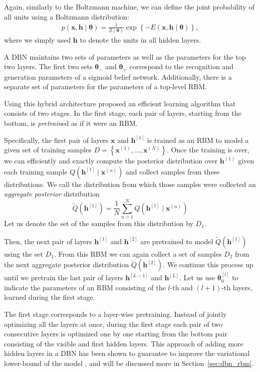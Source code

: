 \documentclass[dissertation,nocontribution]{aaltoseries}
\newcommand{\qlay}[1]{\left[#1\right]}
\newcommand{\vect}[1]{\mathbf{#1}}
\newcommand{\vects}[1]{\boldsymbol{#1}}
\newcommand{\vh}[0]{\vect{h}}
\newcommand{\vx}[0]{\vect{x}}
\newcommand{\TT}[0]{{\vects{\theta}}}
\begin{document}
Again, similarly to the Boltzmann machine, we can define the
joint probability of all units using a Boltzmann
distribution:
\begin{align*}
    p(\vx, \vh \mid \TT) = \frac{1}{Z(\TT)} \exp \left\{
    -E(\vx, \vh \mid \TT)
    \right\},
\end{align*}
where we simply used $\vh$ to denote the units in all hidden
layers.

A DBN maintains two sets of parameters as well as the
parameters for the top two layers.  The first two sets
$\TT_-$ and $\TT_+$ correspond to the recognition and
generation parameters of a sigmoid belief network.
Additionally, there is a separate set of parameters for the
parameters of a top-level RBM.

Using this hybrid architecture \citet{Hinton2006nc} proposed
an efficient learning algorithm that consists of two stages.
In the first stage, each pair of layers, starting from the
bottom, is \textit{pretrain}ed as if it were an RBM.

Specifically, the first pair of layers $\vx$ and
$\vh^{\qlay{1}}$
is trained as an RBM to model a given set of training
samples $D=\left\{ \vx^{(1)}, \dots, \vx^{(N)} \right\}$.
Once the training is over, we can efficiently and exactly
compute the posterior distribution over $\vh^{(1)}$ given
each training sample $Q(\vh^{\qlay{1}} \mid \vx^{(n)})$ and
collect samples from these distributions. We call the
distribution from which those samples were collected an
\textit{aggregate posterior} distribution
\[
\tilde{Q}\left( \vh^{\qlay{1}} \right) = \frac{1}{N}
\sum_{n=1}^N Q\left(\vh^{\qlay{1}} \mid \vx^{(n)}\right)
\]
Let us denote the set of the samples from this distribution by $D_1$. 

Then, the next pair of layers $\vh^{\qlay{1}}$ and
$\vh^{\qlay{2}}$ are pretrained to model $\tilde{Q}\left(
\vh^{\qlay{1}} \right)$ using the set $D_1$. From this RBM
we can again collect a set of samples $D_2$ from the next
aggregate posterior distribution $\tilde{Q}\left(
\vh^{\qlay{2}} \right)$. We continue this process up until
we pretrain the last pair of layers $\vh^{\qlay{L-1}}$ and
$\vh^{\qlay{L}}$. Let us use $\TT_0^{\qlay{l}}$ to indicate the
parameters of an RBM consisting of the $l$-th and $(l+1)$-th
layers, learned during the first stage.

The first stage corresponds to a layer-wise pretraining.
Instead of jointly optimizing all the layers at once, during
the first stage each pair of two consecutive layers is
optimized one by one starting from the bottom pair
consisting of the visible and first hidden layers. This
approach of adding more hidden layers in a DBN has been
shown to guarantee to improve the variational lower-bound of
the model \citep{Hinton2006nc}, and will be discussed more
in Section~\ref{sec:dbn_rbm}.
\end{document}
